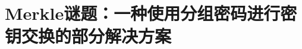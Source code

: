 \section{Merkle谜题：一种使用分组密码进行密钥交换的部分解决方案}\label{sec:10-8}

\begin{protocol}[Merkle 谜题]\label{ptcl:10-1}
	
\end{protocol}